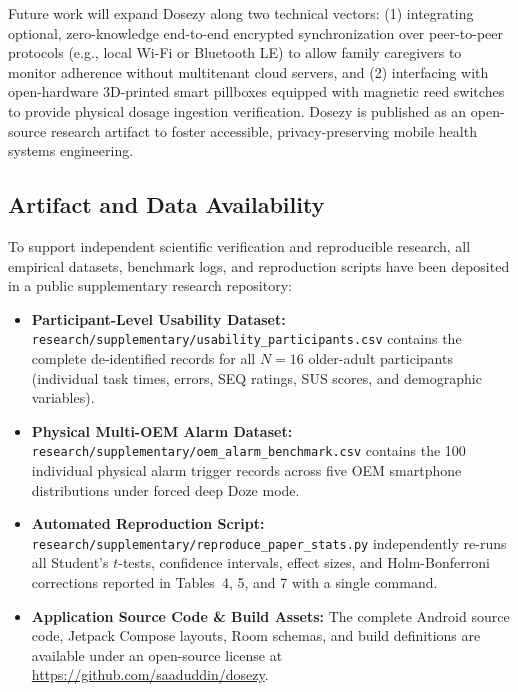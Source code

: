 \documentclass[11pt,a4paper]{article}
\begin{document}
Future work will expand Dosezy along two technical vectors: (1) integrating optional, zero-knowledge end-to-end encrypted synchronization over peer-to-peer protocols (e.g., local Wi-Fi or Bluetooth LE) to allow family caregivers to monitor adherence without multitenant cloud servers, and (2) interfacing with open-hardware 3D-printed smart pillboxes equipped with magnetic reed switches to provide physical dosage ingestion verification. Dosezy is published as an open-source research artifact to foster accessible, privacy-preserving mobile health systems engineering.

\subsection{Artifact and Data Availability}
\label{sec:artifacts}

To support independent scientific verification and reproducible research, all empirical datasets, benchmark logs, and reproduction scripts have been deposited in a public supplementary research repository:
\begin{itemize}[leftmargin=*]
    \item \textbf{Participant-Level Usability Dataset:} \texttt{research/supplementary/usability\_participants.csv} contains the complete de-identified records for all $N=16$ older-adult participants (individual task times, errors, SEQ ratings, SUS scores, and demographic variables).
    \item \textbf{Physical Multi-OEM Alarm Dataset:} \texttt{research/supplementary/oem\_alarm\_benchmark.csv} contains the 100 individual physical alarm trigger records across five OEM smartphone distributions under forced deep Doze mode.
    \item \textbf{Automated Reproduction Script:} \texttt{research/supplementary/reproduce\_paper\_stats.py} independently re-runs all Student's $t$-tests, confidence intervals, effect sizes, and Holm-Bonferroni corrections reported in Tables~4, 5, and 7 with a single command.
    \item \textbf{Application Source Code \& Build Assets:} The complete Android source code, Jetpack Compose layouts, Room schemas, and build definitions are available under an open-source license at \url{https://github.com/saaduddin/dosezy}.
\end{itemize}



\end{document}
